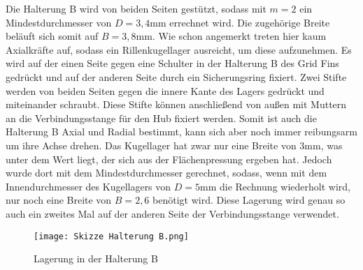 Die Halterung B wird von beiden Seiten gestützt, sodass mit $m = 2$ ein Mindestdurchmesser von $D = 3,4$mm errechnet wird. Die zugehörige Breite beläuft sich somit auf $B = 3,8$mm. Wie schon angemerkt treten hier kaum Axialkräfte auf, sodass ein Rillenkugellager ausreicht, um diese aufzunehmen. Es wird auf der einen Seite gegen eine Schulter in der Halterung B des Grid Fins gedrückt und auf der anderen Seite durch ein Sicherungsring fixiert. Zwei Stifte werden von beiden Seiten gegen die innere Kante des Lagers gedrückt und miteinander schraubt. Diese Stifte können anschließend von außen mit Muttern an die Verbindungsstange für den Hub fixiert werden. Somit ist auch die Halterung B Axial und Radial bestimmt, kann sich aber noch immer reibungsarm um ihre Achse drehen. Das Kugellager hat zwar nur eine Breite von 3mm, was unter dem Wert liegt, der sich aus der Flächenpressung ergeben hat. Jedoch wurde dort mit dem Mindestdurchmesser gerechnet, sodass, wenn mit dem Innendurchmesser des Kugellagers von $D = 5$mm die Rechnung wiederholt wird, nur noch eine Breite von $B =2,6$ benötigt wird. Diese Lagerung wird genau so auch ein zweites Mal auf der anderen Seite der Verbindungsstange verwendet.
\begin{figure}[h] 
	\centering
	\texttt{[image: Skizze Halterung B.png]}
	\caption{Lagerung in der Halterung B}
\end{figure}

